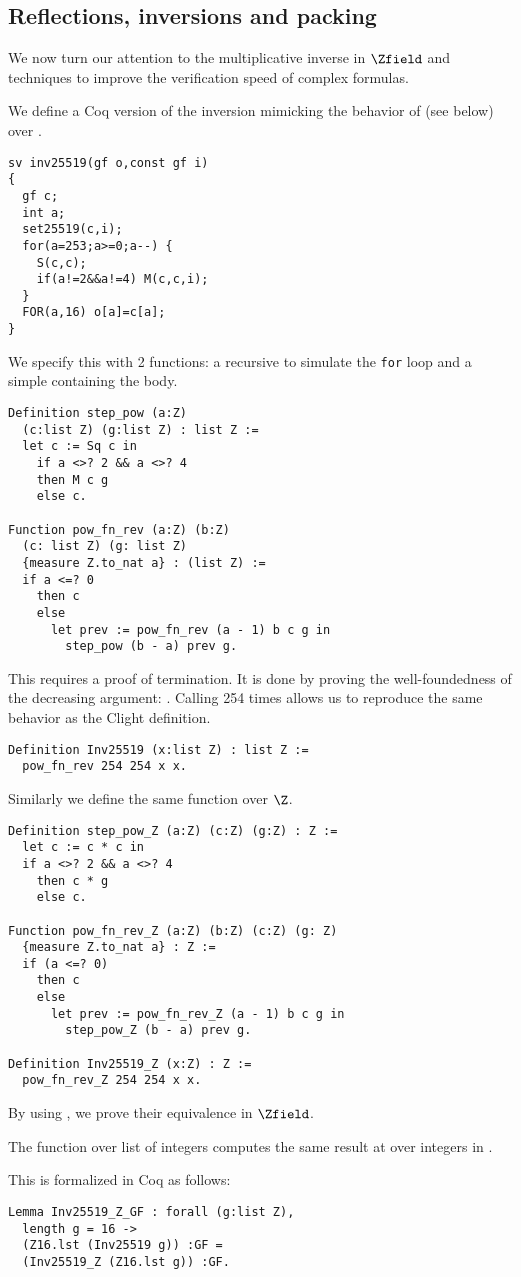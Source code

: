 \subsection{Reflections, inversions and packing}
\label{subsec:inversions-reflections}

We now turn our attention to the multiplicative inverse in $\Zfield$ and techniques
to improve the verification speed of complex formulas.

We define a Coq version of the inversion mimicking
the behavior of  (see below) over .
\begin{lstlisting}[language=Ctweetnacl]
sv inv25519(gf o,const gf i)
{
  gf c;
  int a;
  set25519(c,i);
  for(a=253;a>=0;a--) {
    S(c,c);
    if(a!=2&&a!=4) M(c,c,i);
  }
  FOR(a,16) o[a]=c[a];
}
\end{lstlisting}
We specify this with 2 functions: a recursive 
to simulate the \texttt{for} loop and a simple  containing the body.
\begin{lstlisting}[language=Coq]
Definition step_pow (a:Z)
  (c:list Z) (g:list Z) : list Z :=
  let c := Sq c in
    if a <>? 2 && a <>? 4
    then M c g
    else c.

Function pow_fn_rev (a:Z) (b:Z)
  (c: list Z) (g: list Z)
  {measure Z.to_nat a} : (list Z) :=
  if a <=? 0
    then c
    else
      let prev := pow_fn_rev (a - 1) b c g in
        step_pow (b - a) prev g.
\end{lstlisting}
This  requires a proof of termination. It is done by proving the
well-foundedness of the decreasing argument: . Calling
 254 times allows us to reproduce the same behavior as the Clight definition.
\begin{lstlisting}[language=Coq]
Definition Inv25519 (x:list Z) : list Z :=
  pow_fn_rev 254 254 x x.
\end{lstlisting}
Similarly we define the same function over $\Z$.
\begin{lstlisting}[language=Coq]
Definition step_pow_Z (a:Z) (c:Z) (g:Z) : Z :=
  let c := c * c in
  if a <>? 2 && a <>? 4
    then c * g
    else c.

Function pow_fn_rev_Z (a:Z) (b:Z) (c:Z) (g: Z)
  {measure Z.to_nat a} : Z :=
  if (a <=? 0)
    then c
    else
      let prev := pow_fn_rev_Z (a - 1) b c g in
        step_pow_Z (b - a) prev g.

Definition Inv25519_Z (x:Z) : Z :=
  pow_fn_rev_Z 254 254 x x.
\end{lstlisting}
By using , we prove their equivalence in $\Zfield$.
\begin{lemma}
\label{lemma:Inv_equivalence}
The function  over list of integers computes the same
result at  over integers in \Zfield.
\end{lemma}
This is formalized in Coq as follows:
\begin{lstlisting}[language=Coq]
Lemma Inv25519_Z_GF : forall (g:list Z),
  length g = 16 ->
  (Z16.lst (Inv25519 g)) :GF =
  (Inv25519_Z (Z16.lst g)) :GF.
\end{lstlisting}

